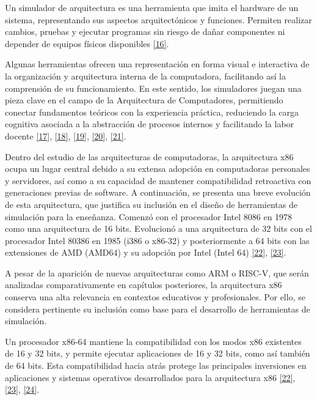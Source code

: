 \documentclass[12pt,oneside]{templates/unerthesis}
\begin{document}
Un simulador de arquitectura es una herramienta que imita el hardware de un sistema, representando sus aspectos arquitectónicos y funciones. Permiten realizar cambios, pruebas y ejecutar programas sin riesgo de dañar componentes ni depender de equipos físicos disponibles \protect\hyperlink{ref-radivojevic_design_2011}{{[}16{]}}.

Algunas herramientas ofrecen una representación en forma visual e interactiva de la organización y arquitectura interna de la computadora, facilitando así la comprensión de su funcionamiento. En este sentido, los simuladores juegan una pieza clave en el campo de la Arquitectura de Computadores, permitiendo conectar fundamentos teóricos con la experiencia práctica, reduciendo la carga cognitiva asociada a la abstracción de procesos internos y facilitando la labor docente \protect\hyperlink{ref-nikolic_survey_2009}{{[}17{]}}, \protect\hyperlink{ref-hasan_survey_2012}{{[}18{]}}, \protect\hyperlink{ref-hennessy2017computer}{{[}19{]}}, \protect\hyperlink{ref-stallings_computer_2021}{{[}20{]}}, \protect\hyperlink{ref-sweller2010cognitive}{{[}21{]}}.

Dentro del estudio de las arquitecturas de computadoras, la arquitectura x86 ocupa un lugar central debido a su extensa adopción en computadoras personales y servidores, así como a su capacidad de mantener compatibilidad retroactiva con generaciones previas de software. A continuación, se presenta una breve evolución de esta arquitectura, que justifica su inclusión en el diseño de herramientas de simulación para la enseñanza. Comenzó con el procesador Intel 8086 en 1978 como una arquitectura de 16 bits. Evolucionó a una arquitectura de 32 bits con el procesador Intel 80386 en 1985 (i386 o x86-32) y posteriormente a 64 bits con las extensiones de AMD (AMD64) y su adopción por Intel (Intel 64) \protect\hyperlink{ref-intel_64_2025}{{[}22{]}}, \protect\hyperlink{ref-amd_developer_2024}{{[}23{]}}.

A pesar de la aparición de nuevas arquitecturas como ARM o RISC-V, que serán analizadas comparativamente en capítulos posteriores, la arquitectura x86 conserva una alta relevancia en contextos educativos y profesionales. Por ello, se considera pertinente su inclusión como base para el desarrollo de herramientas de simulación.

Un procesador x86-64 mantiene la compatibilidad con los modos x86 existentes de 16 y 32 bits, y permite ejecutar aplicaciones de 16 y 32 bits, como así también de 64 bits. Esta compatibilidad hacia atrás protege las principales inversiones en aplicaciones y sistemas operativos desarrollados para la arquitectura x86 \protect\hyperlink{ref-intel_64_2025}{{[}22{]}}, \protect\hyperlink{ref-amd_developer_2024}{{[}23{]}}, \protect\hyperlink{ref-abel_ibm_2000}{{[}24{]}}.
\end{document}
